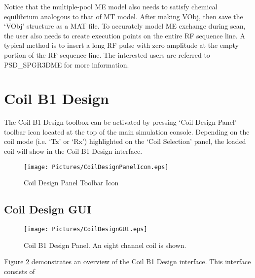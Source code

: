 \documentclass{book}%
\begin{document}
\begin{enumerate}
Notice that the multiple-pool ME model also needs to satisfy chemical equilibrium analogous to that of MT model. After making VObj, then save the `VObj' structure as a MAT file. To accurately model ME exchange during scan, the user also needs to create execution points on the entire RF sequence line. A typical method is to insert a long RF pulse with zero amplitude at the empty portion of the RF sequence line. The interested users are referred to PSD\_SPGR3DME for more information.

\end{enumerate}

\section{Coil B1 Design}

The Coil B1 Design toolbox can be activated by pressing `Coil Design Panel' toolbar icon located at the top of the main simulation console. Depending on the coil mode (i.e. `Tx' or `Rx') highlighted on the `Coil Selection' panel, the loaded coil will show in the Coil B1 Design interface.

\begin{figure}[htbp]
	\centering
		\texttt{[image: Pictures/CoilDesignPanelIcon.eps]}
	\caption{Coil Design Panel Toolbar Icon}
	\label{fig:CoilDesignPanelIcon}
\end{figure}

\subsection{Coil Design GUI}

\begin{figure}[htbp]
	\centering
		\texttt{[image: Pictures/CoilDesignGUI.eps]}
	\caption{Coil B1 Design Panel. An eight channel coil is shown.}
	\label{fig:CoilDesignGUI}
\end{figure}

Figure \ref{fig:CoilDesignGUI} demonstrates an overview of the Coil B1 Design interface. This interface consists of 
\end{document}
